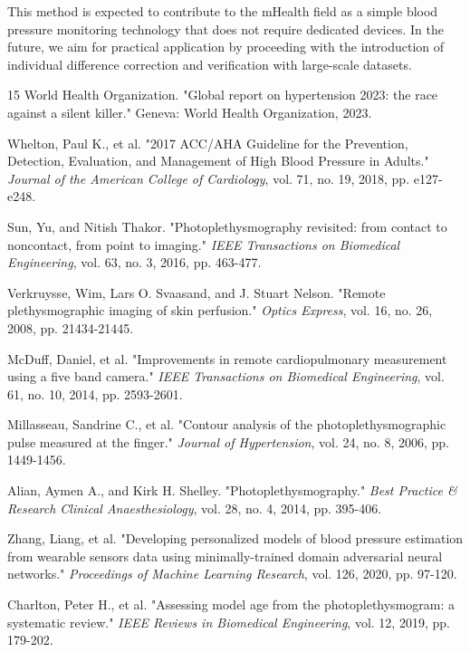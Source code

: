 \documentclass[fleqn,10pt,twocolumn]{AROB}
\begin{document}
This method is expected to contribute to the mHealth field as a simple blood pressure monitoring technology that does not require dedicated devices. In the future, we aim for practical application by proceeding with the introduction of individual difference correction and verification with large-scale datasets.
\begin{thebibliography}{15}
World Health Organization. "Global report on hypertension 2023: the race against a silent killer." Geneva: World Health Organization, 2023.

Whelton, Paul K., et al. "2017 ACC/AHA Guideline for the Prevention, Detection, Evaluation, and Management of High Blood Pressure in Adults." \textit{Journal of the American College of Cardiology}, vol. 71, no. 19, 2018, pp. e127-e248.

Sun, Yu, and Nitish Thakor. "Photoplethysmography revisited: from contact to noncontact, from point to imaging." \textit{IEEE Transactions on Biomedical Engineering}, vol. 63, no. 3, 2016, pp. 463-477.

Verkruysse, Wim, Lars O. Svaasand, and J. Stuart Nelson. "Remote plethysmographic imaging of skin perfusion." \textit{Optics Express}, vol. 16, no. 26, 2008, pp. 21434-21445.

McDuff, Daniel, et al. "Improvements in remote cardiopulmonary measurement using a five band camera." \textit{IEEE Transactions on Biomedical Engineering}, vol. 61, no. 10, 2014, pp. 2593-2601.

Millasseau, Sandrine C., et al. "Contour analysis of the photoplethysmographic pulse measured at the finger." \textit{Journal of Hypertension}, vol. 24, no. 8, 2006, pp. 1449-1456.

Alian, Aymen A., and Kirk H. Shelley. "Photoplethysmography." \textit{Best Practice \& Research Clinical Anaesthesiology}, vol. 28, no. 4, 2014, pp. 395-406.

Zhang, Liang, et al. "Developing personalized models of blood pressure estimation from wearable sensors data using minimally-trained domain adversarial neural networks." \textit{Proceedings of Machine Learning Research}, vol. 126, 2020, pp. 97-120.

Charlton, Peter H., et al. "Assessing model age from the photoplethysmogram: a systematic review." \textit{IEEE Reviews in Biomedical Engineering}, vol. 12, 2019, pp. 179-202.


\end{thebibliography}
\end{document}
